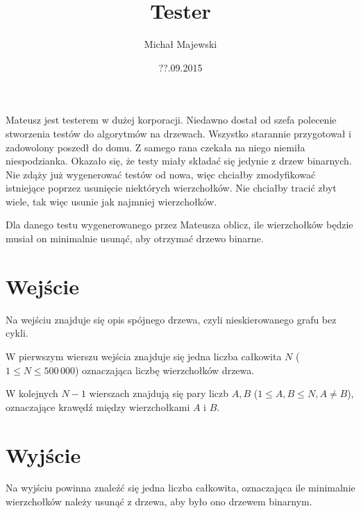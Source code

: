 \documentclass[zad,zawodnik,utf8]{sinol}
\title{Tester}
\author{Michał Majewski} %
\date{??.09.2015}
\begin{document}
\begin{tasktext}%
Mateusz jest testerem w dużej korporacji. Niedawno dostał od szefa polecenie stworzenia testów do algorytmów na drzewach. Wszystko starannie przygotował i zadowolony poszedł do domu.
Z samego rana czekała na niego niemiła niespodzianka. Okazało się, że testy miały składać się jedynie z drzew binarnych. Nie zdąży już wygenerować testów od nowa, więc chciałby zmodyfikować istniejące poprzez usunięcie niektórych wierzchołków. Nie chciałby tracić zbyt wiele, tak więc usunie jak najmniej wierzchołków.

Dla danego testu wygenerowanego przez Mateusza oblicz, ile wierzchołków będzie musiał on minimalnie usunąć, aby otrzymać drzewo binarne.

  \section{Wejście}
Na wejściu znajduje się opis spójnego drzewa, czyli nieskierowanego grafu bez cykli.

W pierwszym wierszu wejścia znajduje się jedna liczba całkowita $N$ ($1 \leq N \leq 500\,000$) oznaczająca liczbę wierzchołków drzewa.

W kolejnych $N - 1$ wierszach znajdują się pary liczb $A, B$ ($1 \leq A, B \leq N, A \neq B$), oznaczające krawędź między wierzchołkami $A$ i $B$.

  \section{Wyjście}
Na wyjściu powinna znaleźć się jedna liczba całkowita, oznaczająca ile minimalnie wierzchołków należy usunąć z drzewa, aby było ono drzewem binarnym.

\makecompactexample

\end{tasktext}
\end{document}
